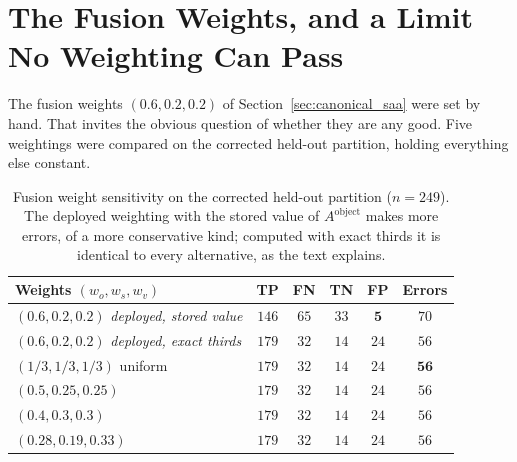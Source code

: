 \documentclass[12pt,a4paper]{report}
\begin{document}
\section{The Fusion Weights, and a Limit No Weighting Can Pass}
\label{sec:weight_sensitivity}

The fusion weights $(0.6, 0.2, 0.2)$ of Section~\ref{sec:canonical_saa} were set by hand. That invites the obvious question of whether they are any good. Five weightings were compared on the corrected held-out
partition, holding everything else constant.

\begin{table}[!htbp]
\centering
\caption[Fusion weight sensitivity on the corrected held-out partition ($n=249$)]{Fusion weight sensitivity on the corrected held-out partition ($n=249$). The deployed weighting with the stored value of $A^{\text{object}}$ makes more errors, of a more conservative kind; computed with exact thirds it is identical to every alternative, as the text explains.}
\label{tab:weight_sensitivity}
\small
\begin{tabular}{@{}l c c c c c@{}}
\toprule
\textbf{Weights $(w_o, w_s, w_v)$} & \textbf{TP} & \textbf{FN} & \textbf{TN} & \textbf{FP} & \textbf{Errors} \\
\midrule
$(0.6, 0.2, 0.2)$ \emph{deployed, stored value} & $146$ & $65$ & $33$ & $\mathbf{5}$ & $70$ \\
$(0.6, 0.2, 0.2)$ \emph{deployed, exact thirds} & $179$ & $32$ & $14$ & $24$ & $56$ \\
$(1/3, 1/3, 1/3)$ uniform & $179$ & $32$ & $14$ & $24$ & $\mathbf{56}$ \\
$(0.5, 0.25, 0.25)$ & $179$ & $32$ & $14$ & $24$ & $56$ \\
$(0.4, 0.3, 0.3)$ & $179$ & $32$ & $14$ & $24$ & $56$ \\
$(0.28, 0.19, 0.33)$ & $179$ & $32$ & $14$ & $24$ & $56$ \\
\bottomrule
\end{tabular}
\end{table}
\end{document}
